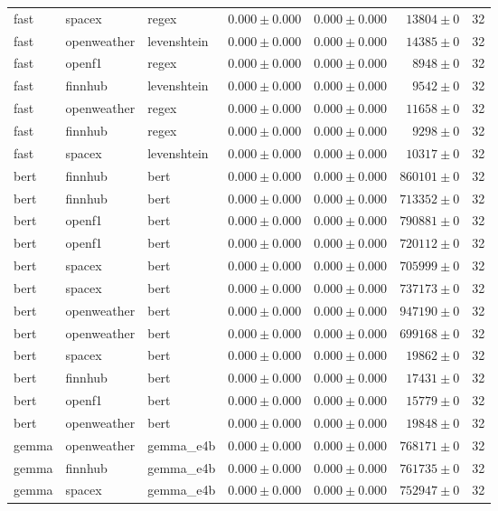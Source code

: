 \begin{table}[htbp]
\begin{tabular}{l l l r r r r}
fast & spacex & regex & $0.000\pm0.000$ & $0.000\pm0.000$ & $13804\pm0$ & 32 \\
fast & openweather & levenshtein & $0.000\pm0.000$ & $0.000\pm0.000$ & $14385\pm0$ & 32 \\
fast & openf1 & regex & $0.000\pm0.000$ & $0.000\pm0.000$ & $8948\pm0$ & 32 \\
fast & finnhub & levenshtein & $0.000\pm0.000$ & $0.000\pm0.000$ & $9542\pm0$ & 32 \\
fast & openweather & regex & $0.000\pm0.000$ & $0.000\pm0.000$ & $11658\pm0$ & 32 \\
fast & finnhub & regex & $0.000\pm0.000$ & $0.000\pm0.000$ & $9298\pm0$ & 32 \\
fast & spacex & levenshtein & $0.000\pm0.000$ & $0.000\pm0.000$ & $10317\pm0$ & 32 \\
bert & finnhub & bert & $0.000\pm0.000$ & $0.000\pm0.000$ & $860101\pm0$ & 32 \\
bert & finnhub & bert & $0.000\pm0.000$ & $0.000\pm0.000$ & $713352\pm0$ & 32 \\
bert & openf1 & bert & $0.000\pm0.000$ & $0.000\pm0.000$ & $790881\pm0$ & 32 \\
bert & openf1 & bert & $0.000\pm0.000$ & $0.000\pm0.000$ & $720112\pm0$ & 32 \\
bert & spacex & bert & $0.000\pm0.000$ & $0.000\pm0.000$ & $705999\pm0$ & 32 \\
bert & spacex & bert & $0.000\pm0.000$ & $0.000\pm0.000$ & $737173\pm0$ & 32 \\
bert & openweather & bert & $0.000\pm0.000$ & $0.000\pm0.000$ & $947190\pm0$ & 32 \\
bert & openweather & bert & $0.000\pm0.000$ & $0.000\pm0.000$ & $699168\pm0$ & 32 \\
bert & spacex & bert & $0.000\pm0.000$ & $0.000\pm0.000$ & $19862\pm0$ & 32 \\
bert & finnhub & bert & $0.000\pm0.000$ & $0.000\pm0.000$ & $17431\pm0$ & 32 \\
bert & openf1 & bert & $0.000\pm0.000$ & $0.000\pm0.000$ & $15779\pm0$ & 32 \\
bert & openweather & bert & $0.000\pm0.000$ & $0.000\pm0.000$ & $19848\pm0$ & 32 \\
gemma & openweather & gemma\_e4b & $0.000\pm0.000$ & $0.000\pm0.000$ & $768171\pm0$ & 32 \\
gemma & finnhub & gemma\_e4b & $0.000\pm0.000$ & $0.000\pm0.000$ & $761735\pm0$ & 32 \\
gemma & spacex & gemma\_e4b & $0.000\pm0.000$ & $0.000\pm0.000$ & $752947\pm0$ & 32 \\

\end{tabular}
\end{table}
